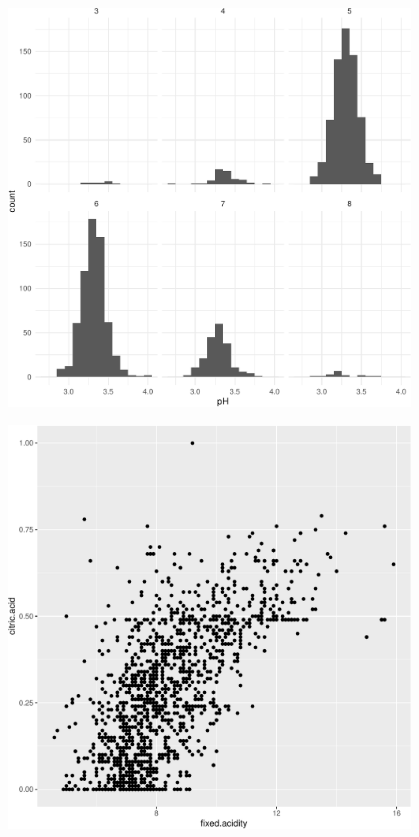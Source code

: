 \begin{frame}
\framebreak
 
\includegraphics[width=0.8\textwidth,height=0.7\textheight,keepaspectratio]{examples/ex-ggplot-06-crop.pdf}

\framebreak
 
\includegraphics[width=0.8\textwidth,height=0.7\textheight,keepaspectratio]{examples/ex-ggplot-07-crop.pdf}


\end{frame}

